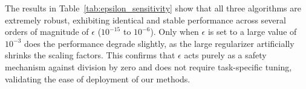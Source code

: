 \documentclass{article}
\theoremstyle{plain}
\theoremstyle{definition}
\theoremstyle{remark}
\begin{document}
The results in Table~\ref{tab:epsilon_sensitivity} show that all three algorithms are extremely robust, exhibiting identical and stable performance across several orders of magnitude of $\epsilon$ ($10^{-15}$ to $10^{-6}$). Only when $\epsilon$ is set to a large value of $10^{-3}$ does the performance degrade slightly, as the large regularizer artificially shrinks the scaling factors. This confirms that $\epsilon$ acts purely as a safety mechanism against division by zero and does not require task-specific tuning, validating the ease of deployment of our methods.

\end{document}
